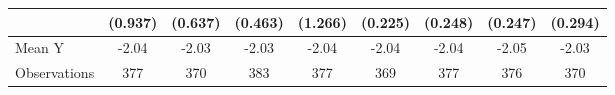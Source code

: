 {\begin{tabular}{l*{8}{c}}
            &     (0.937)         &     (0.637)         &     (0.463)         &     (1.266)         &     (0.225)         &     (0.248)         &     (0.247)         &     (0.294)         \\
\midrule
Mean Y      &       -2.04         &       -2.03         &       -2.03         &       -2.04         &       -2.04         &       -2.04         &       -2.05         &       -2.03         \\
Observations&         377         &         370         &         383         &         377         &         369         &         377         &         376         &         370         \\
\bottomrule
\end{tabular}
}
